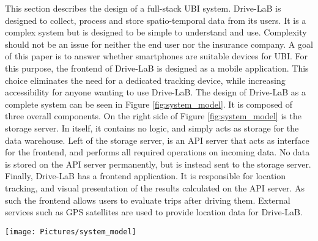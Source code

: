 This section describes the design of a full-stack UBI system. Drive-LaB is designed to collect, process and store spatio-temporal data from its users. It is a complex system but is designed to be simple to understand and use. Complexity should not be an issue for neither the end user nor the insurance company.
A goal of this paper is to answer whether smartphones are suitable devices for UBI. For this purpose, the frontend of Drive-LaB is designed as a mobile application. This choice eliminates the need for a dedicated tracking device, while increasing accessibility for anyone wanting to use Drive-LaB.
The design of Drive-LaB as a complete system can be seen in Figure \ref{fig:system_model}. It is composed of three overall components. On the right side of Figure \ref{fig:system_model} is the storage server. In itself, it contains no logic, and simply acts as storage for the data warehouse. Left of the storage server, is an API server that acts as interface for the frontend, and performs all required operations on incoming data. No data is stored on the API server permanently, but is instead sent to the storage server. Finally, Drive-LaB has a frontend application. It is responsible for location tracking, and visual presentation of the results calculated on the API server. As such the frontend allows users to evaluate trips after driving them. External services such as GPS satellites are used to provide location data for Drive-LaB.

\begin{figure*}[tb]
\centering
\texttt{[image: Pictures/system\_model]}
\caption{Composition of the system}
\label{fig:system_model}
\end{figure*}